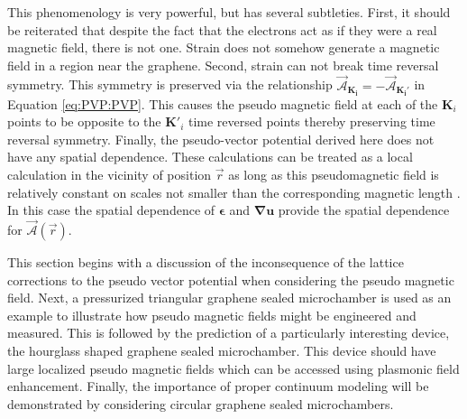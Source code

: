 This phenomenology is very powerful, but has several subtleties.
First, it should be reiterated that despite the fact that the electrons act as if they were a real magnetic field, there is not one.
Strain does not somehow generate a magnetic field in a region near the graphene.
Second, strain can not break time reversal symmetry.
This symmetry is preserved via the relationship $\vec{\mathcal{A}}_{\bm{K_i}} = - \vec{\mathcal{A}}_{\bm{K_i'}}$ in Equation \ref{eq:PVP:PVP}.
This causes the pseudo magnetic field at each of the $\bm{K}_i$ points to be opposite to the $\bm{K}'_i$ time reversed points thereby preserving time reversal symmetry.
Finally, the pseudo-vector potential derived here does not have any spatial dependence.
These calculations can be treated as a local calculation in the vicinity of position $\vec{r}$ as long as this pseudomagnetic field is relatively constant on scales not smaller than the corresponding magnetic length \cite{CastroNeto2009}.
In this case the spatial dependence of $\bm{\epsilon}$ and $\bm{\nabla u}$ provide the spatial dependence for $\vec{\mathcal{A}}(\vec{r})$.

This section begins with a discussion of the inconsequence of the lattice corrections to the pseudo vector potential when considering the pseudo magnetic field.
Next, a pressurized triangular graphene sealed microchamber \cite{Guinea2009} is used as an example to illustrate how pseudo magnetic fields might be engineered and measured.
This is followed by the prediction of a particularly interesting device, the hourglass shaped graphene sealed microchamber.
This device should have large localized pseudo magnetic fields which can be accessed using plasmonic field enhancement.
Finally, the importance of proper continuum modeling will be demonstrated by considering circular graphene sealed microchambers.

